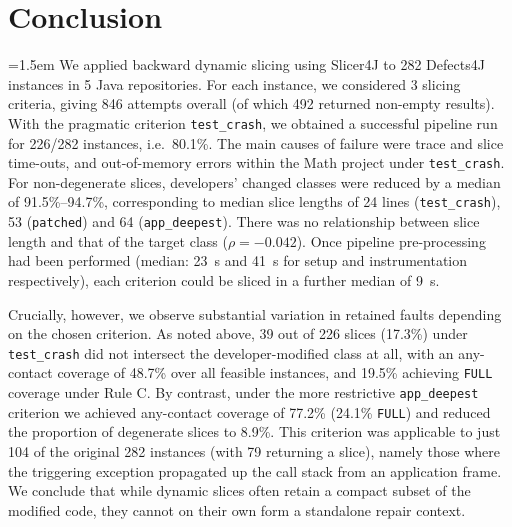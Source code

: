 \documentclass[sigconf,nonacm]{acmart}
\begin{document}
\section{Conclusion}

{\emergencystretch=1.5em We applied backward dynamic slicing using Slicer4J \cite{Ahmed2021Slicer4J} to 282 Defects4J \cite{Just2014Defects4J} instances in 5 Java repositories. For each instance, we considered 3 slicing criteria, giving 846 attempts overall (of which 492 returned non-empty results). \newline With the pragmatic criterion \texttt{test\_crash}, we obtained a successful pipeline run for 226/282 instances, i.e.\ 80.1\%. The main causes of failure were trace and slice time-outs, and out-of-memory errors within the Math project under \texttt{test\_crash}. For non-degenerate slices, developers' changed classes were reduced by a median of 91.5\%--94.7\%, corresponding to median slice lengths of 24 lines (\texttt{test\_\allowbreak crash}), 53 (\texttt{patched}) and 64 (\texttt{app\_deepest}). There was no relationship between slice length and that of the target class ($\rho=-0.042$). Once pipeline pre-processing had been performed (median: 23~s and 41~s for setup and instrumentation respectively), each criterion could be sliced in a further median of 9~s.\par}

Crucially, however, we observe substantial variation in retained faults depending on the chosen criterion. As noted above, 39 out of 226 slices (17.3\%) under \texttt{test\_crash} did not intersect the developer-modified class at all, with an any-contact coverage of 48.7\% over all feasible instances, and 19.5\% achieving \texttt{FULL} coverage under Rule C. By contrast, under the more restrictive \texttt{app\_deepest} criterion we achieved any-contact coverage of 77.2\% (24.1\% \texttt{FULL}) and reduced the proportion of degenerate slices to 8.9\%. This criterion was applicable to just 104 of the original 282 instances (with 79 returning a slice), namely those where the triggering exception propagated up the call stack from an application frame. We conclude that while dynamic slices often retain a compact subset of the modified code, they cannot on their own form a standalone repair context.
\end{document}
